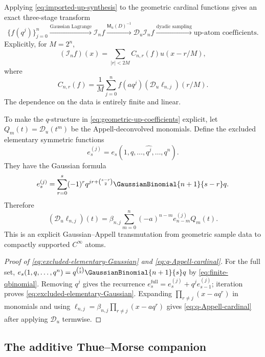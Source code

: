 \documentclass[11pt,a4paper,oneside]{article}
\theoremstyle{definition}
\theoremstyle{remark}
\newcommand{\Iop}{\mathcal I}
\begin{document}
Applying \eqref{eq:imported-up-synthesis} to the geometric cardinal functions
gives an exact three-stage transform
\[
 \{f(q^j)\}_{j=0}^n
 \xrightarrow{\text{Gaussian Lagrange}}
 \Iop_nf
 \xrightarrow{\mathsf M_u(D)^{-1}}
 \mathscr D_u\Iop_nf
 \xrightarrow{\text{dyadic sampling}}
 \text{up-atom coefficients}.
\]
Explicitly, for $M=2^n$,
\begin{equation}
 (\Iop_nf)(x)=\sum_{|r|<2M}C_{n,r}(f)u(x-r/M),
 \label{eq:geometric-up-synthesis}
\end{equation}
where
\begin{equation}
 C_{n,r}(f)=\frac1M\sum_{j=0}^n
 f(aq^j)(\mathscr D_u\ell_{n,j})(r/M).
 \label{eq:geometric-up-coefficients}
\end{equation}
The dependence on the data is entirely finite and linear.

To make the $q$-structure in \eqref{eq:geometric-up-coefficients} explicit,
let $Q_m(t)=\mathscr D_u(t^m)$ be the Appell-deconvolved monomials.  Define the
excluded elementary symmetric functions
\begin{equation}
 e_s^{(j)}=e_s(1,q,\ldots,\widehat{q^j},\ldots,q^n).
 \label{eq:excluded-elementary}
\end{equation}
They have the Gaussian formula
\begin{equation}
 e_s^{(j)}=
 \sum_{r=0}^s(-1)^rq^{jr+\binom{s-r}{2}}
 \GaussianBinomial{n+1}{s-r}q.
 \label{eq:excluded-elementary-Gaussian}
\end{equation}
Therefore
\begin{equation}
 (\mathscr D_u\ell_{n,j})(t)
 =\beta_{n,j}
 \sum_{m=0}^n(-a)^{n-m}e_{n-m}^{(j)}Q_m(t).
 \label{eq:q-Appell-cardinal}
\end{equation}
This is an explicit Gaussian--Appell transmutation from geometric sample data
to compactly supported $C^\infty$ atoms.

\begin{proof}[Proof of \eqref{eq:excluded-elementary-Gaussian} and
\eqref{eq:q-Appell-cardinal}]
For the full set,
$e_s(1,q,\ldots,q^n)=q^{\binom s2}\GaussianBinomial{n+1}{s}q$ by
\eqref{eq:finite-qbinomial}.  Removing $q^j$ gives the recurrence
$e_s^{\mathrm{full}}=e_s^{(j)}+q^je_{s-1}^{(j)}$; iteration proves
\eqref{eq:excluded-elementary-Gaussian}.  Expanding
$\prod_{r\ne j}(x-aq^r)$ in monomials and using
$\ell_{n,j}=\beta_{n,j}\prod_{r\ne j}(x-aq^r)$ gives
\eqref{eq:q-Appell-cardinal} after applying $\mathscr D_u$ termwise.
\end{proof}

\subsection{The additive Thue--Morse companion}
\end{document}

